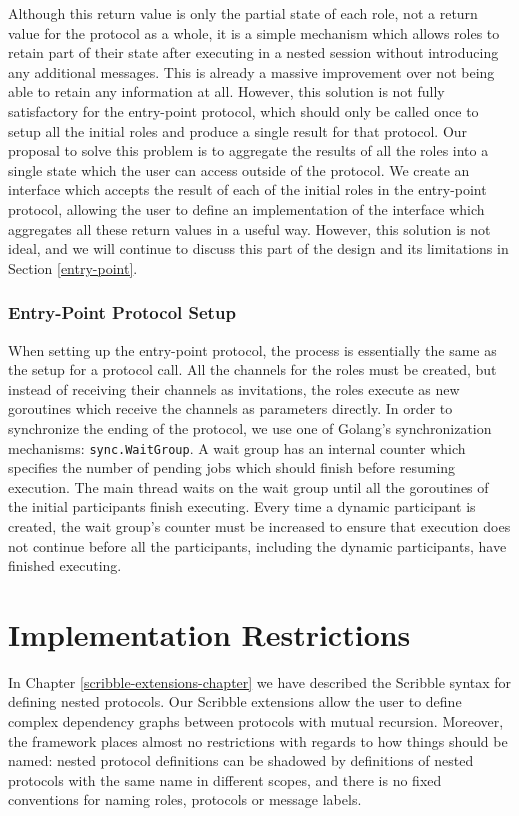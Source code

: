 \documentclass[12pt,twoside]{report}
\begin{document}
Although this return value is only the partial state of each role, not a return value for the protocol as a whole, it is a simple mechanism which allows roles to retain part of their state after executing in a nested session without introducing any additional messages. This is already a massive improvement over not being able to retain any information at all. However, this solution is not fully satisfactory for the entry-point protocol, which should only be called once to setup all the initial roles and produce a single result for that protocol. Our proposal to solve this problem is to aggregate the results of all the roles into a single state which the user can access outside of the protocol. We create an interface which accepts the result of each of the initial roles in the entry-point protocol, allowing the user to define an implementation of the interface which aggregates all these return values in a useful way. However, this solution is not ideal, and we will continue to discuss this part of the design and its limitations in Section \ref{entry-point}.

\subsubsection{Entry-Point Protocol Setup}

When setting up the entry-point protocol, the process is essentially the same as the setup for a protocol call. All the channels for the roles must be created, but instead of receiving their channels as invitations, the roles execute as new goroutines which receive the channels as parameters directly. In order to synchronize the ending of the protocol, we use one of Golang's synchronization mechanisms: \texttt{sync.WaitGroup}. A wait group has an internal counter which specifies the number of pending jobs which should finish before resuming execution. The main thread waits on the wait group until all the goroutines of the initial participants finish executing. Every time a dynamic participant is created, the wait group's counter must be increased to ensure that execution does not continue before all the participants, including the dynamic participants, have finished executing.

\section{Implementation Restrictions}\label{implementation-restrictions}
In Chapter \ref{scribble-extensions-chapter} we have described the Scribble syntax for defining nested protocols. Our Scribble extensions allow the user to define complex dependency graphs between protocols with mutual recursion. Moreover, the framework places almost no restrictions with regards to how things should be named: nested protocol definitions can be shadowed by definitions of nested protocols with the same name in different scopes, and there is no fixed conventions for naming roles, protocols or message labels.\\
\end{document}
